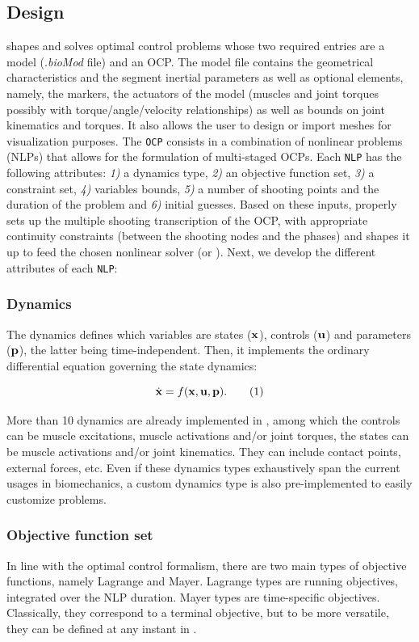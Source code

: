 \subsection{Design}
\bioptim shapes and solves optimal control problems whose two required entries are a model (.\textit{bioMod} file) and an OCP.
The model file contains the geometrical characteristics and the segment inertial parameters as well as optional elements, namely, the markers, the actuators of the model (muscles and joint torques possibly with torque/angle/velocity relationships) as well as bounds on joint kinematics and torques. 
It also allows the user to design or import meshes for visualization purposes.
The \texttt{OCP} consists in a combination of nonlinear problems (NLPs) that allows for the formulation of multi-staged OCPs. 
Each \texttt{NLP} has the following attributes: \textit{1)} a dynamics type, \textit{2)} an objective function set, \textit{3)} a constraint set, \textit{4)} variables bounds, \textit{5)} a number of shooting points and the duration of the problem and \textit{6)} initial guesses.
Based on these inputs, \bioptim properly sets up the multiple shooting transcription of the OCP, with appropriate continuity constraints (between the shooting nodes and the phases) and shapes it up to feed the chosen nonlinear solver (\ipopt or \acados). 
Next, we develop the different attributes of each \texttt{NLP}:

\subsubsection{Dynamics}
The dynamics defines which variables are states ($\mathbf{x}$), controls ($\mathbf{u}$) and parameters ($\mathbf{p}$), the latter being time-independent.
Then, it implements the ordinary differential equation governing the state dynamics:

\[
\dstate = f(\state, \control, \param).
\addtag
\label{eq:state_transition}
\]

\noindent More than 10 dynamics are already implemented in \bioptim, among which the controls can be muscle excitations, muscle activations and/or joint torques, the states can be muscle activations and/or joint kinematics.
They can include contact points, external forces, etc.
Even if these dynamics types exhaustively span the current usages in biomechanics, a custom dynamics type is also pre-implemented to easily customize problems.

\subsubsection{Objective function set}
In line with the optimal control formalism, there are two main types of objective functions, namely Lagrange and Mayer. 
Lagrange types are running objectives, integrated over the NLP duration. Mayer types are time-specific objectives. 
Classically, they correspond to a terminal objective, but to be more versatile, they can be defined at any instant in \bioptim.

